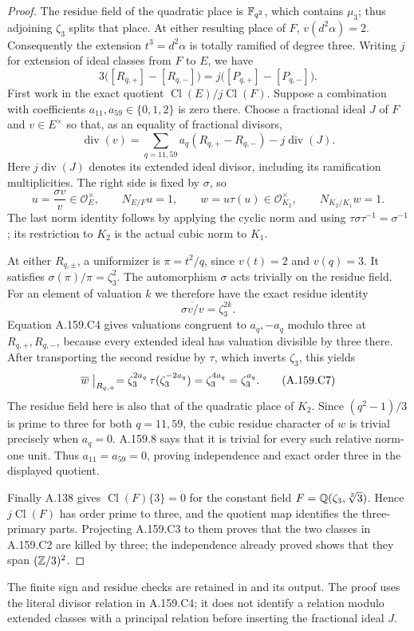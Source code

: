 \begin{proof}
The residue field of the quadratic place is \(\mathbb F_{q^2}\), which contains
\(\mu_3\); thus adjoining \(\zeta_3\) splits that place.  At either
resulting place of \(F\), \(v(d^2\alpha)=2\).  Consequently the
extension \(t^3=d^2\alpha\) is totally ramified of degree three.
Writing \(j\) for extension of ideal classes from \(F\) to \(E\),
we have
\[
 3\bigl([R_{q,+}]-[R_{q,-}]\bigr)
     =j\bigl([P_{q,+}]-[P_{q,-}]\bigr).
\tag{A.159.C3}
\]
First work in the exact quotient \(\operatorname{Cl}(E)/j\operatorname{Cl}(F)\).
Suppose a combination with coefficients \(a_{11},a_{59}\in\{0,1,2\}\)
is zero there.  Choose a fractional ideal \(J\) of \(F\) and
\(v\in E^\times\) so that, as an equality of fractional divisors,
\[
 \operatorname{div}(v)=
 \sum_{q=11,59}a_q(R_{q,+}-R_{q,-})-j\operatorname{div}(J).
\tag{A.159.C4}
\]
Here \(j\operatorname{div}(J)\) denotes its extended ideal divisor,
including its ramification multiplicities.  The right side is fixed by
\(\sigma\), so
\[
 u=\frac{\sigma v}{v}\in\mathcal O_E^\times,\qquad
 N_{E/F}u=1,\qquad w=u\tau(u)\in\mathcal O_{K_2}^\times,
 \qquad N_{K_2/K_1}w=1.
\tag{A.159.C5}
\]
The last norm identity follows by applying the cyclic norm and using
\(\tau\sigma\tau^{-1}=\sigma^{-1}\); its restriction to \(K_2\)
is the actual cubic norm to \(K_1\).

At either \(R_{q,\pm}\), a uniformizer is
\(\pi=t^2/q\), since \(v(t)=2\) and \(v(q)=3\).
It satisfies \(\sigma(\pi)/\pi=\zeta_3^2\).
The automorphism \(\sigma\) acts trivially on the residue field.
For an element of valuation \(k\) we therefore have the exact residue
identity
\[
 \overline{\sigma v/v}=\zeta_3^{2k}.
\tag{A.159.C6}
\]
Equation A.159.C4 gives valuations congruent to \(a_q,-a_q\)
modulo three at \(R_{q,+},R_{q,-}\), because every extended ideal
has valuation divisible by three there.  After transporting the second
residue by \(\tau\), which inverts \(\zeta_3\), this yields
\[
 \overline w\bigm|_{R_{q,+}}
   =\zeta_3^{2a_q}\,\tau(\zeta_3^{-2a_q})
   =\zeta_3^{4a_q}=\zeta_3^{a_q}.
\tag{A.159.C7}
\]
The residue field here is also that of the quadratic place of \(K_2\).
Since \((q^2-1)/3\) is prime to three for both \(q=11,59\), the cubic
residue character of \(w\) is trivial precisely when \(a_q=0\).
A.159.8 says that it is trivial for every such relative norm-one unit.
Thus \(a_{11}=a_{59}=0\), proving independence and exact order three
in the displayed quotient.

Finally A.138 gives
\(\operatorname{Cl}(F)\{3\}=0\) for the constant field
\(F=\mathbb Q(\zeta_3,\sqrt[3]{3})\).
Hence \(j\operatorname{Cl}(F)\) has order prime to three, and the
quotient map identifies the three-primary parts.  Projecting A.159.C3
to them proves that the two classes in A.159.C2 are killed by three;
the independence already proved shows that they span \((\mathbb Z/3)^2\).
\end{proof}

The finite sign and residue checks are retained in
and its output.  The proof uses the literal divisor relation in A.159.C4;
it does not identify a relation modulo extended classes with a principal
relation before inserting the fractional ideal \(J\).

